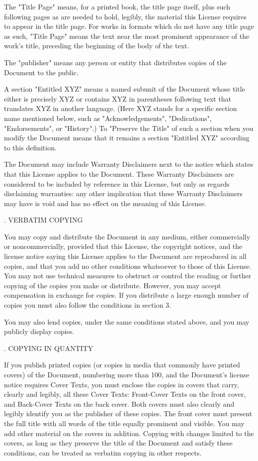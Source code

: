 The "Title Page" means, for a printed book, the title page itself, plus such following pages as are needed to hold, legibly, the material this License requires to appear in the title page. For works in formats which do not have any title page as such, "Title Page" means the text near the most prominent appearance of the work's title, preceding the beginning of the body of the text.

The "publisher" means any person or entity that distributes copies of the Document to the public.

A section "Entitled XYZ" means a named subunit of the Document whose title either is precisely XYZ or contains XYZ in parentheses following text that translates XYZ in another language. (Here XYZ stands for a specific section name mentioned below, such as "Acknowledgements", "Dedications", "Endorsements", or "History".) To "Preserve the Title" of such a section when you modify the Document means that it remains a section "Entitled XYZ" according to this definition.

The Document may include Warranty Disclaimers next to the notice which states that this License applies to the Document. These Warranty Disclaimers are considered to be included by reference in this License, but only as regards disclaiming warranties: any other implication that these Warranty Disclaimers may have is void and has no effect on the meaning of this License.

. VERBATIM COPYING

You may copy and distribute the Document in any medium, either commercially or noncommercially, provided that this License, the copyright notices, and the license notice saying this License applies to the Document are reproduced in all copies, and that you add no other conditions whatsoever to those of this License. You may not use technical measures to obstruct or control the reading or further copying of the copies you make or distribute. However, you may accept compensation in exchange for copies. If you distribute a large enough number of copies you must also follow the conditions in section 3.

You may also lend copies, under the same conditions stated above, and you may publicly display copies.

. COPYING IN QUANTITY

If you publish printed copies (or copies in media that commonly have printed covers) of the Document, numbering more than 100, and the Document's license notice requires Cover Texts, you must enclose the copies in covers that carry, clearly and legibly, all these Cover Texts: Front-Cover Texts on the front cover, and Back-Cover Texts on the back cover. Both covers must also clearly and legibly identify you as the publisher of these copies. The front cover must present the full title with all words of the title equally prominent and visible. You may add other material on the covers in addition. Copying with changes limited to the covers, as long as they preserve the title of the Document and satisfy these conditions, can be treated as verbatim copying in other respects.

